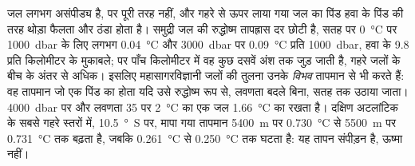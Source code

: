 जल लगभग असंपीड्य है, पर पूरी तरह नहीं, और गहरे से ऊपर लाया गया जल का पिंड हवा के पिंड की तरह थोड़ा फैलता और ठंडा होता है। समुद्री जल की रुद्धोष्म तापह्रास दर छोटी है, सतह पर \qty{0}{\celsius} पर \qty{1000}{dbar} के लिए लगभग \qty{0.04}{\celsius} और \qty{3000}{dbar} पर \qty{0.09}{\celsius} प्रति \qty{1000}{dbar}, हवा के \num{9.8} प्रति किलोमीटर के मुकाबले; पर पाँच किलोमीटर में वह कुछ दसवें अंश तक जुड़ जाती है, गहरे जलों के बीच के अंतर से अधिक। इसलिए महासागरविज्ञानी जलों की तुलना उनके \emph{विभव} तापमान से भी करते हैं: वह तापमान जो एक पिंड का होता यदि उसे रुद्धोष्म रूप से, लवणता बदले बिना, सतह तक उठाया जाता। \qty{4000}{dbar} पर और लवणता 35 पर \qty{2}{\celsius} का एक जल \qty{1.66}{\celsius} का  रखता है। दक्षिण अटलांटिक के सबसे गहरे स्तरों में, \qty{10.5}{\degree S} पर, मापा गया तापमान \qty{5400}{m} पर \qty{0.730}{\celsius} से \qty{5500}{m} पर \qty{0.731}{\celsius} तक बढ़ता है, जबकि  \qty{0.261}{\celsius} से \qty{0.250}{\celsius} तक घटता है: यह तापन संपीड़न है, ऊष्मा नहीं।

